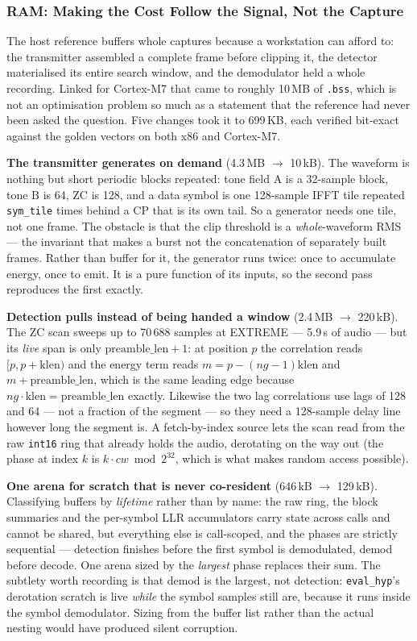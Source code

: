 \subsubsection{RAM: Making the Cost Follow the Signal, Not the Capture}

The host reference buffers whole captures because a workstation can
afford to: the transmitter assembled a complete frame before clipping
it, the detector materialised its entire search window, and the
demodulator held a whole recording. Linked for Cortex-M7 that came to
roughly 10\,MB of \texttt{.bss}, which is not an optimisation problem so
much as a statement that the reference had never been asked the
question. Five changes took it to 699\,KB, each verified bit-exact
against the golden vectors on both x86 and Cortex-M7.

\textbf{The transmitter generates on demand} (4.3\,MB $\rightarrow$
10\,kB). The waveform is nothing but short periodic blocks repeated:
tone field A is a 32-sample block, tone B is 64, ZC is 128, and a data
symbol is one 128-sample IFFT tile repeated \texttt{sym\_tile} times
behind a CP that is its own tail. So a generator needs one tile, not one
frame. The obstacle is that the clip threshold is a \emph{whole}-waveform
RMS --- the invariant that makes a burst not the concatenation of
separately built frames. Rather than buffer for it, the generator runs
twice: once to accumulate energy, once to emit. It is a pure function of
its inputs, so the second pass reproduces the first exactly.

\textbf{Detection pulls instead of being handed a window} (2.4\,MB
$\rightarrow$ 220\,kB). The ZC scan sweeps up to 70\,688 samples at
EXTREME --- 5.9\,s of audio --- but its \emph{live} span is only
$\mathrm{preamble\_len}+1$: at position $p$ the correlation reads
$[p, p{+}\mathrm{klen})$ and the energy term reads
$m = p-(ng{-}1)\mathrm{klen}$ and $m+\mathrm{preamble\_len}$, which is
the same leading edge because $ng \cdot \mathrm{klen} =
\mathrm{preamble\_len}$ exactly. Likewise the two lag correlations use
lags of 128 and 64 --- not a fraction of the segment --- so they need a
128-sample delay line however long the segment is. A fetch-by-index
source lets the scan read from the raw \texttt{int16} ring that already
holds the audio, derotating on the way out (the phase at index $k$ is
$k \cdot cw \bmod 2^{32}$, which is what makes random access possible).

\textbf{One arena for scratch that is never co-resident} (646\,kB
$\rightarrow$ 129\,kB). Classifying buffers by \emph{lifetime} rather
than by name: the raw ring, the block summaries and the per-symbol LLR
accumulators carry state across calls and cannot be shared, but
everything else is call-scoped, and the phases are strictly sequential
--- detection finishes before the first symbol is demodulated, demod
before decode. One arena sized by the \emph{largest} phase replaces
their sum. The subtlety worth recording is that demod is the largest,
not detection: \texttt{eval\_hyp}'s derotation scratch is live
\emph{while} the symbol samples still are, because it runs inside the
symbol demodulator. Sizing from the buffer list rather than the actual
nesting would have produced silent corruption.

